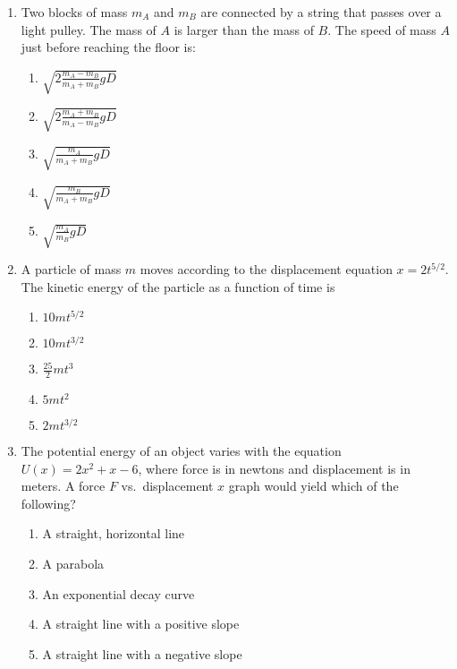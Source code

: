 \documentclass{../../oss-apphys}
\begin{document}
\begin{multicols}{2}
\begin{enumerate}[resume,leftmargin=18pt]
  \item Two blocks of mass $m_A$ and $m_B$ are connected by a string that
    passes over a light pulley. The mass of $A$ is larger than the mass of $B$.
    The speed of mass $A$ just before reaching the floor is:
    \begin{center}
    \end{center}
    \begin{enumerate}[noitemsep,topsep=0pt,leftmargin=18pt,label=(\Alph*)]
    \item $\displaystyle\sqrt{2\frac{m_A-m_B}{m_A+m_B}gD}$
    \item $\displaystyle\sqrt{2\frac{m_A+m_B}{m_A-m_B}gD}$
    \item $\displaystyle\sqrt{\frac{m_A}{m_A+m_B}gD}$
    \item $\displaystyle\sqrt{\frac{m_B}{m_A+m_B}gD}$
    \item $\displaystyle\sqrt{\frac{m_A}{m_B}gD}$
    \end{enumerate}

  \item A particle of mass $m$ moves according to the displacement equation
    $x=2t^{5/2}$. The kinetic energy of the particle as a function of time is
    \begin{enumerate}[noitemsep,topsep=0pt,leftmargin=18pt,label=(\Alph*)]
    \item $10mt^{5/2}$
    \item $10mt^{3/2}$
    \item $\displaystyle\frac{25}{2}mt^3$
    \item $5mt^2$
    \item $2mt^{3/2}$
    \end{enumerate}

  \item The potential energy of an object varies with the equation
    $U(x)=2x^2+x-6$, where force is in newtons and displacement is in meters. A
    force $F$ vs.\ displacement $x$ graph would yield which of the following?
    \begin{enumerate}[noitemsep,topsep=0pt,leftmargin=18pt,label=(\Alph*)]
    \item A straight, horizontal line
    \item A parabola
    \item An exponential decay curve
    \item A straight line with a positive slope
    \item A straight line with a negative slope
    \end{enumerate}


\end{enumerate}
\end{multicols}
\end{document}
